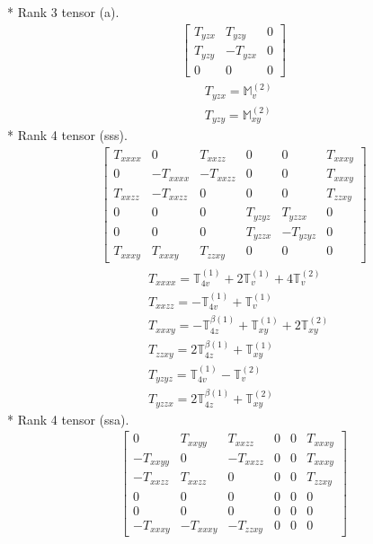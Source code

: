 \documentclass[fleqn,8pt,landscape]{jsarticle}
\begin{document}
* Rank 3 tensor (a).
\begin{align*}
\begin{bmatrix} T_{yzx} & T_{yzy} & 0 \\ T_{yzy} & - T_{yzx} & 0 \\ 0 & 0 & 0 \end{bmatrix}
\end{align*}
\begin{align*}
& T_{yzx} = \mathbb{M}_{v}^{(2)} \\
& T_{yzy} = \mathbb{M}_{xy}^{(2)}
\end{align*}
* Rank 4 tensor (sss).
\begin{align*}
\begin{bmatrix} T_{xxxx} & 0 & T_{xxzz} & 0 & 0 & T_{xxxy} \\ 0 & - T_{xxxx} & - T_{xxzz} & 0 & 0 & T_{xxxy} \\ T_{xxzz} & - T_{xxzz} & 0 & 0 & 0 & T_{zzxy} \\ 0 & 0 & 0 & T_{yzyz} & T_{yzzx} & 0 \\ 0 & 0 & 0 & T_{yzzx} & - T_{yzyz} & 0 \\ T_{xxxy} & T_{xxxy} & T_{zzxy} & 0 & 0 & 0 \end{bmatrix}
\end{align*}
\begin{align*}
& T_{xxxx} = \mathbb{T}_{4v}^{(1)} + 2 \mathbb{T}_{v}^{(1)} + 4 \mathbb{T}_{v}^{(2)} \\
& T_{xxzz} = - \mathbb{T}_{4v}^{(1)} + \mathbb{T}_{v}^{(1)} \\
& T_{xxxy} = - \mathbb{T}_{4z}^{\beta(1)} + \mathbb{T}_{xy}^{(1)} + 2 \mathbb{T}_{xy}^{(2)} \\
& T_{zzxy} = 2 \mathbb{T}_{4z}^{\beta(1)} + \mathbb{T}_{xy}^{(1)} \\
& T_{yzyz} = \mathbb{T}_{4v}^{(1)} - \mathbb{T}_{v}^{(2)} \\
& T_{yzzx} = 2 \mathbb{T}_{4z}^{\beta(1)} + \mathbb{T}_{xy}^{(2)}
\end{align*}
* Rank 4 tensor (ssa).
\begin{align*}
\begin{bmatrix} 0 & T_{xxyy} & T_{xxzz} & 0 & 0 & T_{xxxy} \\ - T_{xxyy} & 0 & - T_{xxzz} & 0 & 0 & T_{xxxy} \\ - T_{xxzz} & T_{xxzz} & 0 & 0 & 0 & T_{zzxy} \\ 0 & 0 & 0 & 0 & 0 & 0 \\ 0 & 0 & 0 & 0 & 0 & 0 \\ - T_{xxxy} & - T_{xxxy} & - T_{zzxy} & 0 & 0 & 0 \end{bmatrix}
\end{align*}
\end{document}
